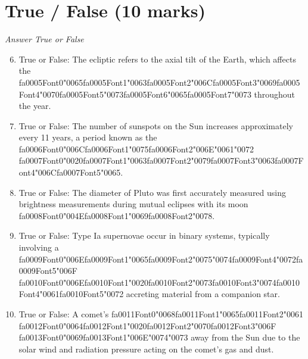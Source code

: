 \documentclass[12pt]{article}
\begin{document}
\section*{True / False (10 marks)}
\textit{Answer True or False}
\begin{enumerate}[label=\arabic*.]
\setcounter{enumi}{5}
\item True or False: The ecliptic refers to the axial tilt of the Earth, which affects the {\csname fa0005Font0\endcsname\char"0065}{\csname fa0005Font1\endcsname\char"0063}{\csname fa0005Font2\endcsname\char"006C}{\csname fa0005Font3\endcsname\char"0069}{\csname fa0005Font4\endcsname\char"0070}{\csname fa0005Font5\endcsname\char"0073}{\csname fa0005Font6\endcsname\char"0065}{\csname fa0005Font7\endcsname\char"0073} throughout the year.
\item True or False: The number of sunspots on the Sun increases approximately every 11 years, a period known as the {\csname fa0006Font0\endcsname\char"006C}{\csname fa0006Font1\endcsname\char"0075}{\csname fa0006Font2\endcsname\char"006E}{\char"0061}{\char"0072} {\csname fa0007Font0\endcsname\char"0020}{\csname fa0007Font1\endcsname\char"0063}{\csname fa0007Font2\endcsname\char"0079}{\csname fa0007Font3\endcsname\char"0063}{\csname fa0007Font4\endcsname\char"006C}{\csname fa0007Font5\endcsname\char"0065}.
\item True or False: The diameter of Pluto was first accurately measured using brightness measurements during mutual eclipses with its moon {\csname fa0008Font0\endcsname\char"004E}{\csname fa0008Font1\endcsname\char"0069}{\csname fa0008Font2\endcsname\char"0078}.
\item True or False: Type Ia supernovae occur in binary systems, typically involving a {\csname fa0009Font0\endcsname\char"006E}{\csname fa0009Font1\endcsname\char"0065}{\csname fa0009Font2\endcsname\char"0075}{\char"0074}{\csname fa0009Font4\endcsname\char"0072}{\csname fa0009Font5\endcsname\char"006F} {\csname fa0010Font0\endcsname\char"006E}{\csname fa0010Font1\endcsname\char"0020}{\csname fa0010Font2\endcsname\char"0073}{\csname fa0010Font3\endcsname\char"0074}{\csname fa0010Font4\endcsname\char"0061}{\csname fa0010Font5\endcsname\char"0072} accreting material from a companion star.
\item True or False: A comet's {\csname fa0011Font0\endcsname\char"0068}{\csname fa0011Font1\endcsname\char"0065}{\csname fa0011Font2\endcsname\char"0061} {\csname fa0012Font0\endcsname\char"0064}{\csname fa0012Font1\endcsname\char"0020}{\csname fa0012Font2\endcsname\char"0070}{\csname fa0012Font3\endcsname\char"006F} {\csname fa0013Font0\endcsname\char"0069}{\csname fa0013Font1\endcsname\char"006E}{\char"0074}{\char"0073} away from the Sun due to the solar wind and radiation pressure acting on the comet's gas and dust.
\end{enumerate}
\end{document}
